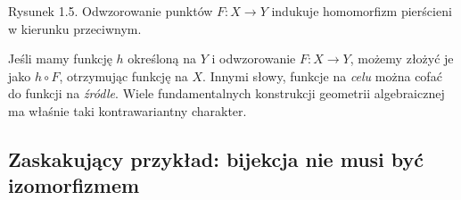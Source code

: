 \begin{center}
\end{center}
\begin{center}\small Rysunek 1.5. Odwzorowanie punktów $F:X\to Y$ indukuje homomorfizm pierścieni w kierunku przeciwnym.\end{center}

\begin{uwaga}
Jeśli mamy funkcję $h$ określoną na $Y$ i odwzorowanie
$F:X\to Y$, możemy złożyć je jako $h\circ F$,
otrzymując funkcję na $X$. Innymi słowy, funkcje na \emph{celu}
można cofać do funkcji na \emph{źródle}.
Wiele fundamentalnych konstrukcji geometrii algebraicznej
ma właśnie taki kontrawariantny charakter.
\end{uwaga}

\subsection{Zaskakujący przykład: bijekcja nie musi być izomorfizmem}

